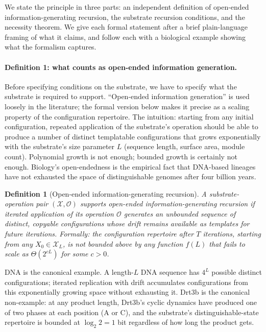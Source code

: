 \documentclass[aps,prx,reprint,amsmath,amssymb,floatfix,superscriptaddress,nofootinbib]{revtex4-2}
\theoremstyle{plain-thm}
\theoremstyle{definition-thm}
\newtheorem{definition}[theorem]{Definition}
\newcommand{\Xset}{\mathcal{X}}
\newcommand{\Op}{\mathcal{O}}
\begin{document}
We state the principle in three parts: an independent definition of open-ended information-generating recursion, the substrate recursion conditions, and the necessity theorem. We give each formal statement after a brief plain-language framing of what it claims, and follow each with a biological example showing what the formalism captures.

\paragraph{Definition 1: what counts as open-ended information generation.}

Before specifying conditions on the substrate, we have to specify what the substrate is required to support. ``Open-ended information generation'' is used loosely in the literature; the formal version below makes it precise as a scaling property of the configuration repertoire. The intuition: starting from any initial configuration, repeated application of the substrate's operation should be able to produce a number of distinct templatable configurations that grows exponentially with the substrate's size parameter $L$ (sequence length, surface area, module count). Polynomial growth is not enough; bounded growth is certainly not enough. Biology's open-endedness is the empirical fact that DNA-based lineages have not exhausted the space of distinguishable genomes after four billion years.

\begin{definition}[Open-ended information-generating recursion]
\label{def:openended}
A substrate-operation pair $(\Xset, \Op)$ supports \textnormal{open-ended information-generating recursion} if iterated application of its operation $\Op$ generates an unbounded sequence of distinct, copyable configurations whose drift remains available as templates for future iterations. Formally: the configuration repertoire after $T$ iterations, starting from any $X_0 \in \Xset_L$, is not bounded above by any function $f(L)$ that fails to scale as $\Theta(2^{cL})$ for some $c > 0$.
\end{definition}

DNA is the canonical example. A length-$L$ DNA sequence has $4^L$ possible distinct configurations; iterated replication with drift accumulates configurations from this exponentially growing space without exhausting it. Drt3b is the canonical non-example: at any product length, Drt3b's cyclic dynamics have produced one of two phases at each position (A or C), and the substrate's distinguishable-state repertoire is bounded at $\log_2 2 = 1$ bit regardless of how long the product gets.
\end{document}

